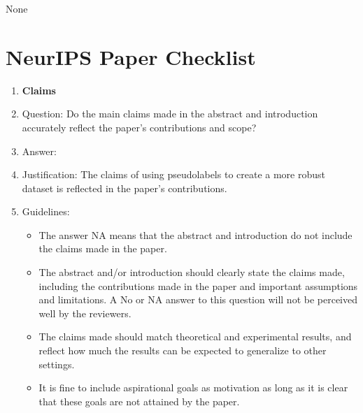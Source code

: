 \documentclass{article}
\begin{document}
None




\newpage
\section*{NeurIPS Paper Checklist}

\begin{enumerate}

\item {\bf Claims}
    \item[] Question: Do the main claims made in the abstract and introduction accurately reflect the paper's contributions and scope?
    \item[] Answer: \answerYes{} %
    \item[] Justification: The claims of using pseudolabels to create a more robust dataset is reflected in the paper's contributions. 
    \item[] Guidelines:
    \begin{itemize}
        \item The answer NA means that the abstract and introduction do not include the claims made in the paper.
        \item The abstract and/or introduction should clearly state the claims made, including the contributions made in the paper and important assumptions and limitations. A No or NA answer to this question will not be perceived well by the reviewers. 
        \item The claims made should match theoretical and experimental results, and reflect how much the results can be expected to generalize to other settings. 
        \item It is fine to include aspirational goals as motivation as long as it is clear that these goals are not attained by the paper. 
    \end{itemize}


\end{enumerate}
\end{document}

